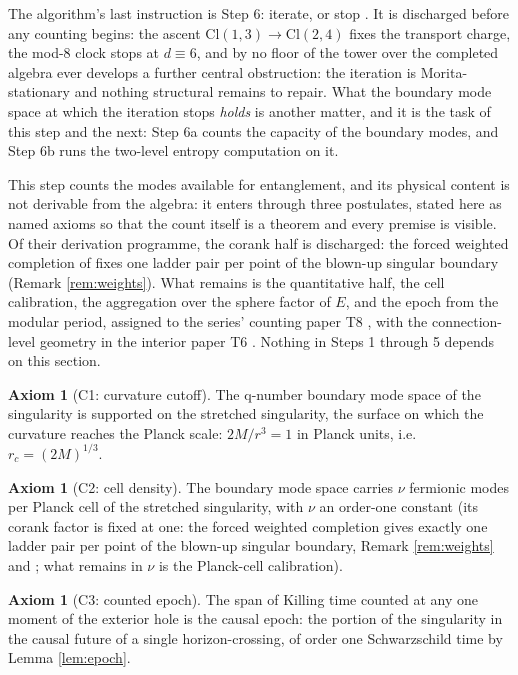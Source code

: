\documentclass[11pt]{article}
\theoremstyle{definition}
\newtheorem{axiom}[theorem]{Axiom}
\newcommand{\Cl}{\mathrm{Cl}}
\begin{document}
The algorithm's last instruction is Step 6: iterate, or stop \cite[\S 8.1, Step 6]{ButlerT1}. It is discharged before any counting begins: the ascent $\Cl(1,3) \to \Cl(2,4)$ fixes the transport charge, the mod-8 clock stops at $d \equiv 6$, and by \cite[Thm.~3.6]{ButlerT3} no floor of the tower over the completed algebra ever develops a further central obstruction: the iteration is Morita-stationary and nothing structural remains to repair. What the boundary mode space at which the iteration stops \emph{holds} is another matter, and it is the task of this step and the next: Step 6a counts the capacity of the boundary modes, and Step 6b runs the two-level entropy computation on it.

This step counts the modes available for entanglement, and its physical content is not derivable from the algebra: it enters through three postulates, stated here as named axioms so that the count itself is a theorem and every premise is visible. Of their derivation programme, the corank half is discharged: the forced weighted completion of \cite[\S 8]{ButlerT4} fixes one ladder pair per point of the blown-up singular boundary (Remark \ref{rem:weights}). What remains is the quantitative half, the cell calibration, the aggregation over the sphere factor of $E$, and the epoch from the modular period, assigned to the series' counting paper T8 \cite{ButlerT8}, with the connection-level geometry in the interior paper T6 \cite{ButlerT6}. Nothing in Steps 1 through 5 depends on this section.

\begin{axiom}[C1: curvature cutoff]\label{ax:cutoff}
The q-number boundary mode space of the singularity is supported on the stretched singularity, the surface on which the curvature reaches the Planck scale: $2M/r^3 = 1$ in Planck units, i.e.\ $r_c = (2M)^{1/3}$.
\end{axiom}

\begin{axiom}[C2: cell density]\label{ax:cell}
The boundary mode space carries $\nu$ fermionic modes per Planck cell of the stretched singularity, with $\nu$ an order-one constant (its corank factor is fixed at one: the forced weighted completion gives exactly one ladder pair per point of the blown-up singular boundary, Remark \ref{rem:weights} and \cite[Thm.~8.7, \S 8.9]{ButlerT4}; what remains in $\nu$ is the Planck-cell calibration).
\end{axiom}

\begin{axiom}[C3: counted epoch]\label{ax:epoch}
The span of Killing time counted at any one moment of the exterior hole is the causal epoch: the portion of the singularity in the causal future of a single horizon-crossing, of order one Schwarzschild time by Lemma \ref{lem:epoch}.
\end{axiom}
\end{document}
